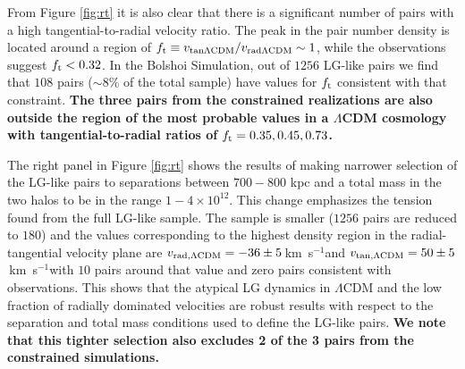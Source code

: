 \documentclass{emulateapj}
\newcommand{\kms}{\,km~s$^{-1}$}
\newcommand{\Msun}{{\ifmmode{{\rm {M_{\odot}}}}\else{${\rm{M_{\odot}}}$}\fi}}
\begin{document}
From Figure \ref{fig:rt} it is also clear that there is a significant number of pairs with a high tangential-to-radial velocity ratio. The peak in the pair number density is located around a region of $f_{\rm t}\equiv v_{\rm tan \Lambda CDM}/v_{\rm rad \Lambda CDM}\sim 1$, while the observations suggest $f_{\rm t}<0.32$. In the Bolshoi Simulation, out of $1256$ LG-like pairs we find that $108$ pairs ($\sim 8\%$ of the total sample) have values for $f_{\rm t}$ consistent with that constraint. {\bf The three pairs from the constrained realizations are also outside the region of the most probable values in a $\Lambda$CDM cosmology with tangential-to-radial ratios of $f_{\rm t}= 0.35, 0.45, 0.73$.}

The right panel in Figure \ref{fig:rt} shows the results of making narrower selection of the LG-like pairs to separations between $700-800$ kpc and a total mass in the two halos to be in the range $1-4 \times 10^{12}$\Msun. This change emphasizes the tension found from the full LG-like sample. The sample is smaller ($1256$ pairs are reduced to $180$) and the values corresponding to the highest density region in the radial-tangential velocity plane are  $v_{\rm rad,\Lambda CDM} = -36\pm 5$\kms and $v_{\rm tan,\Lambda CDM} = 50\pm5$\kms with $10$ pairs around that value and zero pairs consistent with observations. This shows that the atypical LG dynamics in $\Lambda$CDM and the low fraction of radially dominated velocities are robust results with respect to the separation and total mass conditions used to define the LG-like pairs. {\bf We note that this tighter selection also excludes 2 of the 3 pairs from the constrained simulations.}
\end{document}
